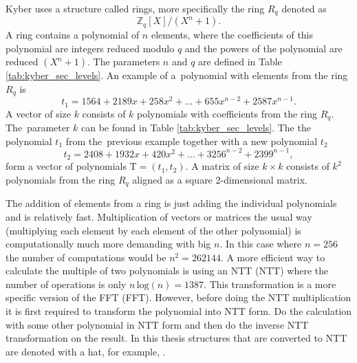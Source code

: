 Kyber uses a structure called rings, more specifically the ring $R_q$ denoted as
\begin{equation}
  \mathbb{Z}_q[X]/(X^n+1).
\end{equation}
A ring contains a polynomial of $n$ elements, where the coefficients of this polynomial are integers reduced modulo $q$ and the powers of the polynomial are reduced $(X^n+1)$. The parameters $n$ and $q$ are defined in Table \ref{tab:kyber_sec_levels}. An example of a~polynomial with elements from the ring $R_q$ is
\begin{equation}
  t_1 = 1564 + 2189x + 258x^2 + \dots + 655x^{n-2} + 2587x^{n-1}.
\end{equation}
A vector of size $k$ consists of $k$ polynomials with coefficients from the ring $R_q$. The~parameter $k$ can be found in Table \ref{tab:kyber_sec_levels}. The the polynomial $t_1$ from the~previous example together with a new polynomial $t_2$
\begin{equation}
  t_2 = 2408 + 1932x + 420x^2 + \dots + 3256^{n-2} + 2399^{n-1},
\end{equation}
form a vector of polynomials $\mathrm{T}=(t_1, t_2)$. A matrix of size $k\times k$ consists of $k^2$ polynomials from the ring $R_q$ aligned as a square 2-dimensional matrix. \cite{YbbuGxVPF0GGTxfN}

The addition of elements from a ring is just adding the individual polynomials and is relatively fast. Multiplication of vectors or matrices the usual way (multiplying each element by each element of the other polynomial) is computationally much more demanding with big $n$. In this case where $n=256$ the number of computations would be $n^2=262144$. A more efficient way to calculate the multiple of two polynomials is using an NTT (\acl{NTT}) where the number of operations is only $n\,\mathrm{log}(n)=1387$. This transformation is a more specific version of the FFT (\acl{FFT}). However, before doing the NTT multiplication it is first required to transform the polynomial into NTT form. Do the calculation with some other polynomial in NTT form and then do the inverse NTT transformation on the result. In this thesis structures that are converted to NTT are denoted with a hat, for example, . \cite{Liang2021}
